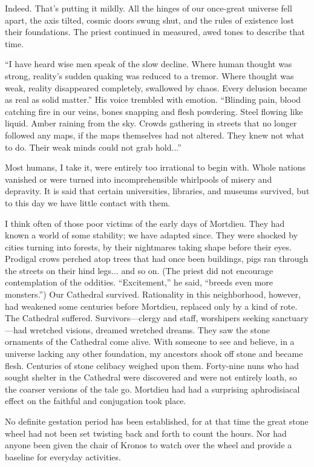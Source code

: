 Indeed. That’s putting it mildly. All the hinges of our once-great universe fell apart, the axis tilted, cosmic doors swung shut, and the rules of existence lost their foundations. The priest continued in measured, awed tones to describe that time.

“I have heard wise men speak of the slow decline. Where human thought was strong, reality’s sudden quaking was reduced to a tremor. Where thought was weak, reality disappeared completely, swallowed by chaos. Every delusion became as real as solid matter.” His voice trembled with emotion. “Blinding pain, blood catching fire in our veins, bones snapping and flesh powdering. Steel flowing like liquid. Amber raining from the sky. Crowds gathering in streets that no longer followed any maps, if the maps themselves had not altered. They knew not what to do. Their weak minds could not grab hold...”

Most humans, I take it, were entirely too irrational to begin with. Whole nations vanished or were turned into incomprehensible whirlpools of misery and depravity. It is said that certain universities, libraries, and museums survived, but to this day we have little contact with them.

I think often of those poor victims of the early days of Mortdieu. They had known a world of some stability; we have adapted since. They were shocked by cities turning into forests, by their nightmares taking shape before their eyes. Prodigal crows perched atop trees that had once been buildings, pigs ran through the streets on their hind legs... and so on. (The priest did not encourage contemplation of the oddities. “Excitement,” he said, “breeds even more monsters.”) Our Cathedral survived. Rationality in this neighborhood, however, had weakened some centuries before Mortdieu, replaced only by a kind of rote. The Cathedral suffered. Survivors—clergy and staff, worshipers seeking sanctuary—had wretched visions, dreamed wretched dreams. They saw the stone ornaments of the Cathedral come alive. With someone to see and believe, in a universe lacking any other foundation, my ancestors shook off stone and became flesh. Centuries of stone celibacy weighed upon them. Forty-nine nuns who had sought shelter in the Cathedral were discovered and were not entirely loath, so the coarser versions of the tale go. Mortdieu had had a surprising aphrodisiacal effect on the faithful and conjugation took place.

No definite gestation period has been established, for at that time the great stone wheel had not been set twisting back and forth to count the hours. Nor had anyone been given the chair of Kronos to watch over the wheel and provide a baseline for everyday activities.

